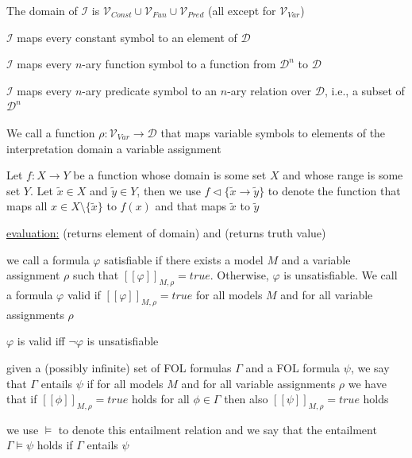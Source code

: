 \documentclass[landscape, a4paper]{article}
\begin{document}
\begin{minipage}[t]{0.2\linewidth}
\begin{betterlist}
\begin{betterlist}
			\begin{betterlist}
				\item The domain of $\mathcal{I}$ is $\mathcal{V}_{Const} \cup \mathcal{V}_{Fun} \cup \mathcal{V}_{Pred}$ (all \alert{except for $\mathcal{V}_{Var}$})
				\item $\mathcal{I}$ maps every constant symbol to an element of $\mathcal{D}$
				\item $\mathcal{I}$ maps every $n$-ary function symbol to a function from $\mathcal{D}^n$ to $\mathcal{D}$
				\item $\mathcal{I}$ maps every $n$-ary predicate symbol to an $n$-ary relation over $\mathcal{D}$, i.e., a subset of $\mathcal{D}^n$
			\end{betterlist}
			We call a function $\rho : \mathcal{V}_{Var} \rightarrow \mathcal{D}$ that maps variable symbols to elements of the interpretation domain a \alert{variable assignment}
			\item Let $f : X \rightarrow Y$ be a function whose domain is some set $X$ and whose range is some set $Y$. Let $\tilde x \in X$ and $\tilde y \in Y$, then we use $f \triangleleft \{\tilde x \rightarrow \tilde y\}$ to denote the function that maps all $x \in X\setminus \{\tilde x\}$  to $f (x)$ and that maps $\tilde x$ to $\tilde y$
			\item \underline{evaluation:}  (returns \alert{element of domain}) and  (returns \alert{truth value})
		\end{betterlist}
		\item we call a formula $\varphi$ \alert{satisfiable} if there exists a model $M$ and a variable assignment $\rho$ such that $[[\varphi]]_{M,\rho} = true$. Otherwise, $\varphi$ is \alert{unsatisfiable}. We call a formula $\varphi$ \alert{valid} if $[[\varphi]]_{M,\rho} = true$ for all models $M$ and for all variable assignments $\rho$
		\begin{betterlist}
			\item $\varphi$ is valid iff $\neg \varphi$ is unsatisfiable
		\end{betterlist}
		\item given a (possibly infinite) set of FOL formulas $\Gamma$ and a FOL formula $\psi$, we say that $\Gamma$ \alert{entails} $\psi$ if for all models $M$ and for all variable assignments $\rho$ we have that if $[[\phi]]_{M,\rho} = true$ holds for all $\phi \in \Gamma$ then also $[[\psi]]_{M,\rho} = true$ holds
		\begin{betterlist}
			\item we use $\models$ to denote this entailment relation and we say that \alert{the entailment $\Gamma \models \psi$ holds} if $\Gamma$ entails $\psi$

\end{betterlist}
\end{betterlist}
\end{minipage}
\end{document}
